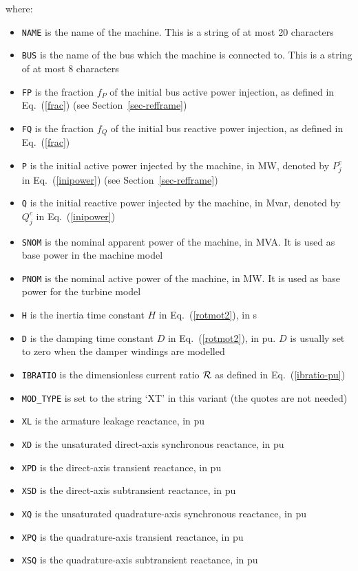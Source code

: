where:
\begin{itemize}
\item {\tt NAME} is the name of the machine. This is a string of at most 20 characters
\item {\tt BUS} is the name of the bus which the machine is connected to. This is a string of at most 8 characters
\item {\tt FP} is the fraction $f_P$ of the initial bus active power injection, as defined in Eq.~(\ref{frac}) (see Section~\ref{sec-refframe})
\item {\tt FQ} is the fraction $f_Q$ of the initial bus reactive power injection, as defined in Eq.~(\ref{frac})
\item {\tt P} is the initial active power injected by the machine, in MW, denoted by $P^c_j$ in Eq.~(\ref{inipower}) (see Section~\ref{sec-refframe})
\item {\tt Q} is the initial reactive power injected by the machine, in Mvar, denoted by $Q^c_j$ in Eq.~(\ref{inipower})
\item {\tt SNOM} is the nominal apparent power of the machine, in MVA. It is used as base power in the machine model
\item {\tt PNOM} is the nominal active power of the machine, in MW. It is used as base power for the turbine model
\item {\tt H} is the inertia time constant $H$ in Eq.~(\ref{rotmot2}), in s
\item {\tt D} is the damping time constant $D$ in Eq.~(\ref{rotmot2}), in pu. $D$ is usually set to zero when the damper windings are modelled
\item {\tt IBRATIO} is the dimensionless current ratio ${\cal R}$ as defined in Eq.~(\ref{ibratio-pu})
\item {\tt MOD\_TYPE} is set to the string `XT' in this variant (the quotes are not needed)
\item {\tt XL} is the armature leakage reactance, in pu
\item {\tt XD} is the unsaturated direct-axis synchronous reactance, in pu
\item {\tt XPD} is the direct-axis transient reactance, in pu
\item {\tt XSD} is the direct-axis subtransient reactance, in pu
\item {\tt XQ} is the unsaturated quadrature-axis synchronous reactance, in pu
\item {\tt XPQ} is the quadrature-axis transient reactance, in pu
\item {\tt XSQ} is the quadrature-axis subtransient reactance, in pu

\end{itemize}
